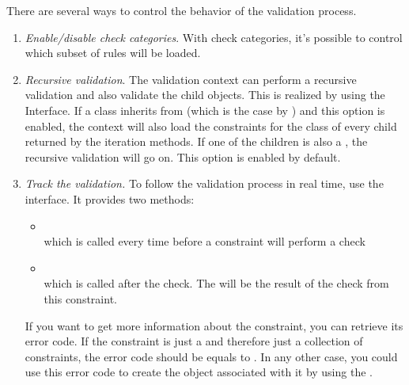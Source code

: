 There are several ways to control the behavior of the validation process.

\begin{enumerate}

\item \emph{Enable/disable check categories}.  With check categories,
  it's possible to control which subset of rules will be loaded. 

\item \emph{Recursive validation}.  The validation context can perform a
  recursive validation and also validate the child objects. This is realized
  by using the \TreeNode Interface. If a class inherits from \TreeNode (which
  is the case by \SBase) and this option is enabled, the context will also
  load the constraints for the class of every child returned by the \TreeNode
  iteration methods. If one of the children is also a \TreeNode, the
  recursive validation will go on. This option is enabled by default.

\item \emph{Track the validation.}  To follow the validation process in real
  time, use the  interface.  It provides two
  methods:

  \begin{itemize}

  \item {} \\ 
    which is called every time before a constraint will perform a check

  \item {} \\
    which is called after the check. The  will be the result of the check from this constraint.

  \end{itemize}

  If you want to get more information about the constraint, you can retrieve
  its error code. If the constraint is just a  and
  therefore just a collection of constraints, the error code should be equals
  to . In any other case, you could use
  this error code to create the  object associated with it
  by using the .

\end{enumerate}


